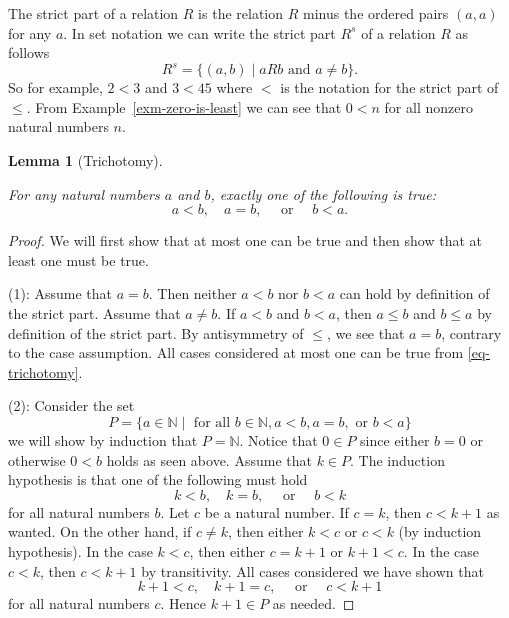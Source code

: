 \documentclass[
  twoside,
  12pt,
  letterpaper]{article}
\theoremstyle{definition}
\theoremstyle{plain}
\newtheorem{lemma}{Lemma}[section]
\theoremstyle{plain}
\theoremstyle{definition}
\theoremstyle{definition}
\theoremstyle{remark}
\begin{document}
The strict part of a relation \(R\) is the relation \(R\) minus the
ordered pairs \((a,a)\) for any \(a.\) In set notation we can write the
strict part \(R^s\) of a relation \(R\) as follows \[
R^s = \{(a,b) \mid aRb \text{ and } a\neq b \}.
\] So for example, \(2<3\) and \(3<45\) where \(<\) is the notation for
the strict part of \(\leq.\) From Example~\ref{exm-zero-is-least} we can
see that \(0<n\) for all nonzero natural numbers \(n\).

\begin{lemma}[Trichotomy]\protect\hypertarget{lem-trichotomy}{}\label{lem-trichotomy}

For any natural numbers \(a\) and \(b\), exactly one of the following is
true: \begin{equation}
\label{eq-trichotomy}
a < b, \quad a = b, \quad \text{ or } \quad b < a.
\end{equation}

\end{lemma}

\begin{proof}

We will first show that at most one can be true and then show that at
least one must be true.

(1): Assume that \(a=b\). Then neither \(a<b\) nor \(b<a\) can hold by
definition of the strict part. Assume that \(a\neq b\). If \(a<b\) and
\(b<a\), then \(a\leq b\) and \(b\leq a\) by definition of the strict
part. By antisymmetry of \(\leq\), we see that \(a=b\), contrary to the
case assumption. All cases considered at most one can be true from
\eqref{eq-trichotomy}.

(2): Consider the set \[
P =\{ a\in \mathbb{N} \mid \text{ for all } b\in \mathbb{N}, a < b, a=b, \text{ or } b < a \}
\] we will show by induction that \(P=\mathbb{N}\). Notice that
\(0\in P\) since either \(b=0\) or otherwise \(0<b\) holds as seen
above. Assume that \(k\in P\). The induction hypothesis is that one of
the following must hold \begin{equation}
\label{eq-trichotomy-hypothesis}
k < b, \quad k = b, \quad \text{ or } \quad b < k
\end{equation} for all natural numbers \(b\). Let \(c\) be a natural
number. If \(c=k\), then \(c < k+1\) as wanted. On the other hand, if
\(c\neq k\), then either \(k<c\) or \(c<k\) (by induction hypothesis).
In the case \(k < c\), then either \(c=k+1\) or \(k+1 < c.\) In the case
\(c < k\), then \(c < k+1\) by transitivity. All cases considered we
have shown that \begin{equation}
\label{eq-trichotomy-hypothesis-two}
k+1 < c, \quad k+1 = c, \quad \text{ or } \quad c < k+1
\end{equation} for all natural numbers \(c\). Hence \(k+1\in P\) as
needed.

\end{proof}
\end{document}
